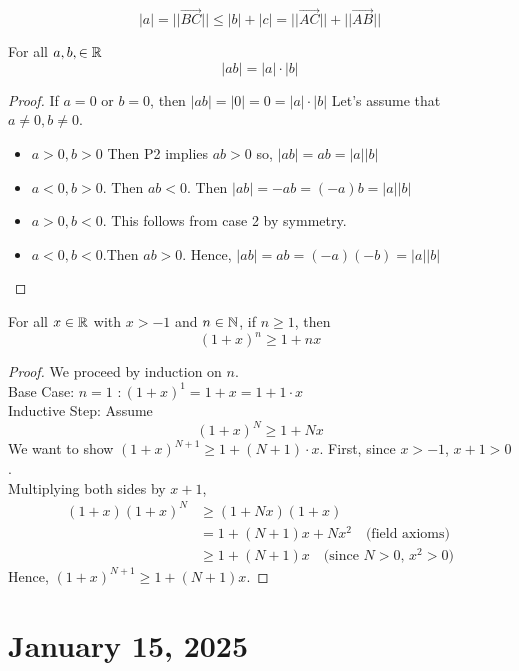 \documentclass[11pt]{article}
\begin{document}
\[ |a| = ||\vec{BC}|| \leq |b| + |c| = ||\vec{AC}|| + ||\vec{AB}|| \]
\begin{proposition}
	For all \(a, b, \in \mathbb R\) \[ |ab| = |a|\cdot|b|\]
\end{proposition}
\begin{proof}
	If \(a = 0\) or \(b = 0\), then \(|ab| = |0| = 0 = |a|\cdot|b|\)
	Let's assume that \(a \neq 0, b \neq 0\).
	\begin{itemize}
		\item \(a > 0, b > 0\) Then P2 implies \(ab > 0\) so, \(|ab| = ab = |a||b|\)
		\item \(a < 0, b > 0\). Then \(ab < 0\). Then \(|ab| = -ab = (-a)b = |a||b|\)
		\item \(a > 0, b < 0\). This follows from case 2 by symmetry.
		\item \(a < 0, b < 0\).Then \(ab > 0\). Hence, \(|ab| = ab = (-a)(-b) = |a||b|\)
	\end{itemize}
\end{proof}

\begin{theorem} 
	For all \(x \in \mathbb R\) with \(x > -1\) and \(n \in \mathbb N\), if \(n \geq 1\), then \[(1 + x)^n \geq 1 + nx\]
\end{theorem}
\begin{proof}
	We proceed by induction on \(n\). \\
	Base Case: \(n = 1\) \(\colon (1 + x)^{1} = 1 + x = 1 + 1 \cdot x\)\\
	Inductive Step: Assume
	\[
		(1 + x)^N \geq 1 + Nx
	\]
	We want to show \((1 + x)^{N + 1} \geq 1 + (N + 1) \cdot x\). First, since \(x
	> -1\), \(x + 1 > 0\). \\ Multiplying both sides by \(x + 1\),
	\begin{align*}
		(1 + x)(1 + x)^N & \geq (1 + Nx)(1 + x)                                          \\
		                 & = 1 + (N + 1)x + Nx^2 \quad \text{(field axioms)}             \\
		                 & \geq 1 + (N + 1)x \quad \text{(since \(N > 0\), \(x^2 > 0\))}
	\end{align*}
	Hence, \((1 + x)^{N + 1} \geq 1 + (N + 1)x\).
\end{proof}
\section{January 15, 2025}
\end{document}
